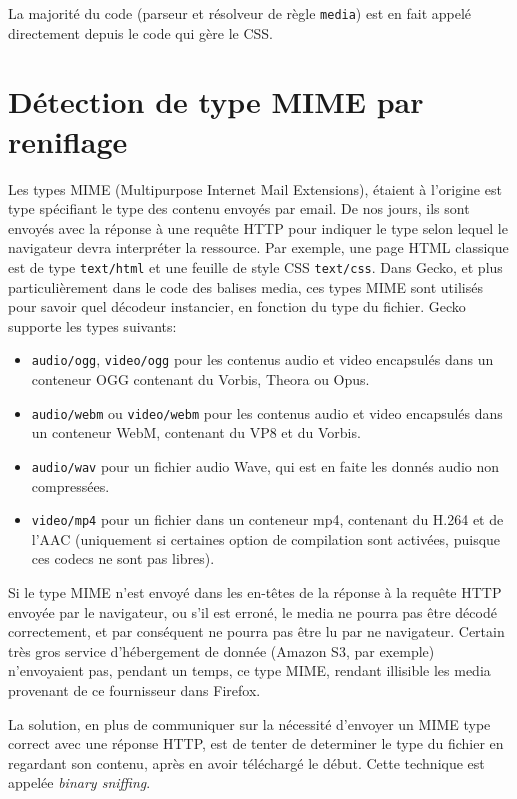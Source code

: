 \documentclass[a4paper,10pt]{article}
\newcommand{\cc}[1]{\texttt{#1}}
\begin{document}
\begin{multicols}{2}
  La majorité du code (parseur et résolveur de règle \cc{media}) est en fait
  appelé directement depuis le code qui gère le CSS.

  \section{Détection de type MIME par reniflage}
    Les types MIME (Multipurpose Internet Mail Extensions), étaient à l'origine
    est type spécifiant le type des contenu envoyés par email. De nos jours, ils
    sont envoyés avec la réponse à une requête HTTP pour indiquer le type selon
    lequel le navigateur devra interpréter la ressource. Par exemple, une page
    HTML classique est de type \cc{text/html} et une feuille de style CSS
    \cc{text/css}. Dans Gecko, et plus particulièrement dans le code des balises
    media, ces types MIME sont utilisés pour savoir quel décodeur instancier, en
    fonction du type du fichier. Gecko supporte les types suivants:

    \begin{itemize}
      \item \cc{audio/ogg}, \cc{video/ogg} pour les contenus audio et video
        encapsulés dans un conteneur OGG contenant du Vorbis, Theora ou Opus.
      \item \cc{audio/webm} ou \cc{video/webm} pour les contenus audio et video
        encapsulés dans un conteneur WebM, contenant du VP8 et du Vorbis.
      \item \cc{audio/wav} pour un fichier audio Wave, qui est en faite les
        donnés audio non compressées.
      \item \cc{video/mp4} pour un fichier dans un conteneur mp4, contenant du
        H.264 et de l'AAC (uniquement si certaines option de compilation sont
        activées, puisque ces codecs ne sont pas libres).
    \end{itemize}

    Si le type MIME n'est envoyé dans les en-têtes de la réponse à la requête
    HTTP envoyée par le navigateur, ou s'il est erroné, le media ne pourra pas
    être décodé correctement, et par conséquent ne pourra pas être lu par ne
    navigateur. Certain très gros service d'hébergement de donnée (Amazon S3,
    par exemple) n'envoyaient pas, pendant un temps, ce type MIME, rendant 
    illisible les media provenant de ce fournisseur dans Firefox.

    La solution, en plus de communiquer sur la nécessité d'envoyer un MIME type
    correct avec une réponse HTTP, est de tenter de determiner le type du
    fichier en regardant son contenu, après en avoir téléchargé le début. Cette
    technique est appelée \emph{binary sniffing}.


\end{multicols}
\end{document}
